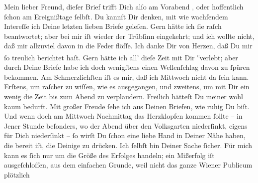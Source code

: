 \pstart\center{}Mein lieber Freund,\pend\vspace{0.5em}
\pstart
           dieſer Brief trifft Dich alſo am Vorabend{ }\label{K_L02750-1v}\label{K_L02750-1}\textcolor{gray}{,} oder hoffentlich ſchon am Ereignißtage ſelbſt. Du kannſt Dir denken, mit wie wachſendem Intereſſe
               ich Deine letzten lieben Briefe geleſen. Gern hätte ich ſie raſch beantwortet; aber
               bei mir iſt wieder der Trübſinn eingekehrt; und ich wollte nicht, daß mir allzuviel
               davon in die Feder flöſſe. Ich danke Dir \strikeout{\textcolor{gray}{v}} von Herzen, daß Du mir ſo treulich berichtet haſt. Gern  hätte ich all’ dieſe Zeit {\pb}mit Dir \substVorne{}\textsuperscript{\textcolor{gray}{e}}\substDazwischen{}v\substHinten{}erlebt; aber durch Deine Briefe habe ich doch wenigſtens einen Wellenſchlag
               davon zu ſpüren bekommen. Am \strikeout{\textcolor{gray}{S}\textcolor{gray}{×}\-\textcolor{gray}{×}\-\textcolor{gray}{×}\-\textcolor{gray}{×}\-\textcolor{gray}{×}\textcolor{gray}{ſten}} Schmerzlichſten iſt es mir, daß ich Mittwoch
               nicht da ſein kann. Erſtens, um raſcher zu wiſſen, wie es ausgegangen, und zweitens,
               um  mit Dir ein wenig die Zeit bis zum Abend zu verplaudern. Freilich
               hätteſt Du meiner wohl kaum bedurft. Mit großer Freude ſehe ich aus Deinen Briefen,
               wie ruhig Du biſt. Und wenn doch am Mittwoch{ }Nachmittag das Herzklopfen kommen ſollte – in Jener Stunde beſonders, wo
               der Abend über den {\pb}\strikeout{\textcolor{gray}{×}\-\textcolor{gray}{×}\-\textcolor{gray}{×}\-\textcolor{gray}{×}\-\textcolor{gray}{×}\-\textcolor{gray}{×}\-\textcolor{gray}{×}}{ }Volksgarten niederſinkt, eigens für Dich
               niederſinkt – ſo wirſt Du ſchon eine liebe Hand in Deiner Nähe haben, die bereit iſt,
               die Deinige zu drücken. Ich ſelbſt bin Deiner Sache ſicher.  Für mich kann es ſich nur um die Größe des Erfolges handeln; ein Mißerfolg iſt
               ausgeſchloſſen,  aus dem einfachen Grunde, weil
               nicht das ganze Wiener Publicum plötzlich
